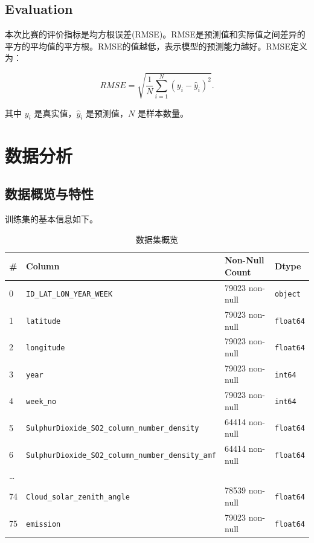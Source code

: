 \documentclass{ctexart}
\begin{document}
\subsection{Evaluation}

本次比赛的评价指标是均方根误差(RMSE)。RMSE是预测值和实际值之间差异的平方的平均值的平方根。RMSE的值越低，表示模型的预测能力越好。RMSE定义为：

\[
    RMSE=\sqrt{\frac{1}{N}\sum\limits_{i=1}^{N}(y_i-\hat y_i)^2}.
\]

其中 $y_i$ 是真实值，$\hat y_i$ 是预测值，$N$ 是样本数量。

\section{数据分析}

\subsection{数据概览与特性}

训练集的基本信息如下。

\begin{table}[h]
      \centering
      \caption{数据集概览}
      \begin{tabular}{llll}
          \hline
          \# & Column & Non-Null Count & Dtype \\ \hline
          0 & \texttt{ID\_LAT\_LON\_YEAR\_WEEK} & 79023 non-null & \texttt{object} \\
          1 & \texttt{latitude} & 79023 non-null & \texttt{float64} \\
          2 & \texttt{longitude} & 79023 non-null & \texttt{float64} \\
          3 & \texttt{year} & 79023 non-null & \texttt{int64} \\
          4 & \texttt{week\_no} & 79023 non-null & \texttt{int64} \\
          5 & \texttt{SulphurDioxide\_SO2\_column\_number\_density} & 64414 non-null & \texttt{float64} \\
          6 & \texttt{SulphurDioxide\_SO2\_column\_number\_density\_amf} & 64414 non-null & \texttt{float64} \\
          \ldots{} & & & \\
          74 & \texttt{Cloud\_solar\_zenith\_angle} & 78539 non-null & \texttt{float64} \\
          75 & \texttt{emission} & 79023 non-null & \texttt{float64} \\
          \hline
      \end{tabular}
\end{table}
\end{document}
